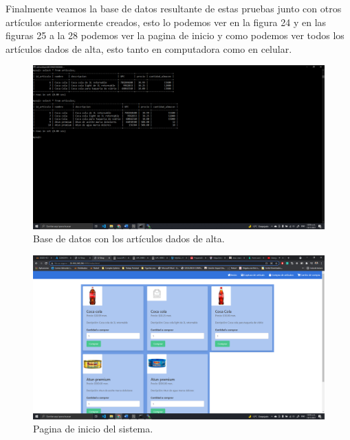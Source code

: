 \documentclass[11pt]{article}
\begin{document}
		Finalmente veamos la base de datos resultante de estas pruebas junto con otros artículos anteriormente creados, esto lo podemos ver en la figura 24 y en las figuras 25 a la 28 podemos ver la pagina de inicio y como podemos ver todos los artículos dados de alta, esto tanto en computadora como en celular.
		\begin{figure}[H]
			\centering
			\includegraphics[scale=0.34]{resources/bdp1.png}
			\caption{Base de datos con los artículos dados de alta.}\label{fig:picture}
		\end{figure}
		\begin{figure}[H]
			\centering
			\includegraphics[scale=0.34]{resources/inicio_productos.png}
			\caption{Pagina de inicio del sistema.}\label{fig:picture}
		\end{figure}
\end{document}
